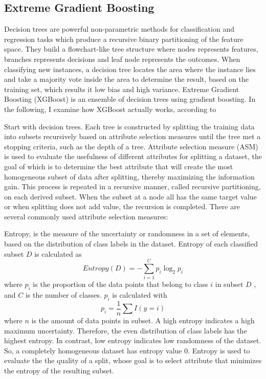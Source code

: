 \documentclass[12pt,a4paper,english
]{tunithesis}
\begin{document}
\subsection{Extreme Gradient Boosting}
Decision trees are powerful non-parametric methods for classification and regression tasks which produce a recursive binary partitioning of the feature space. They build a flowchart-like tree structure where nodes represents features, branches represents decisions and leaf node represents the outcomes. When classifying new instances, a decision tree locates the area where the instance lies and take a majority vote inside the area to determine the result, based on the training set, which results it low bias and high variance. Extreme Gradient Boosting (XGBoost) is an ensemble of decision trees using gradient boosting. In the following, I examine how XGBoost actually works, according to \textcite{song2015, chen2016, mitchell2017, hastie2009, stanford_ml, geek_xgboost}

Start with decision trees. Each tree is constructed by splitting the training data into subsets recursively based on attribute selection measures until the tree met a stopping criteria, such as the depth of a tree. Attribute selection measure (ASM) is used to evaluate the usefulness of different attributes for splitting a dataset, the goal of which is to determine the best attribute that will create the most homogeneous subset of data after splitting, thereby maximizing the information gain. This process is repeated in a recursive manner, called recursive partitioning, on each derived subset. When the subset at a node all has the same target value or when splitting does not add value, the recursion is completed. There are several commonly used attribute selection measures:

Entropy, is the measure of the uncertainty or randomness in a set of elements, based on the distribution of class labels in the dataset. Entropy of each classified subset ${D}$ is calculated as
\begin{equation}
    Entropy(D)=-\sum_{i = 1}^C {p_i} \log _2 {p_i}
\end{equation}
where ${p_i}$ is the proportion of the data points that belong to class ${i}$ in subset ${D}$ , and ${C}$ is the number of classes. ${p_i}$ is calculated with
\begin{equation}
    p_i = \frac{1}{n} \sum I(y=i)
\end{equation}
where ${n}$ is the amount of data points in subset.
A high entropy indicates a high maximum uncertainty. Therefore, the even distribution of class labels has the highest entropy. In contrast, low entropy indicates low randomness of the dataset. So, a completely homogeneous dataset has entropy value 0. Entropy is used to evaluate the the quality of a split, whose goal is to select attribute that minimizes the entropy of the resulting subset.
\end{document}

